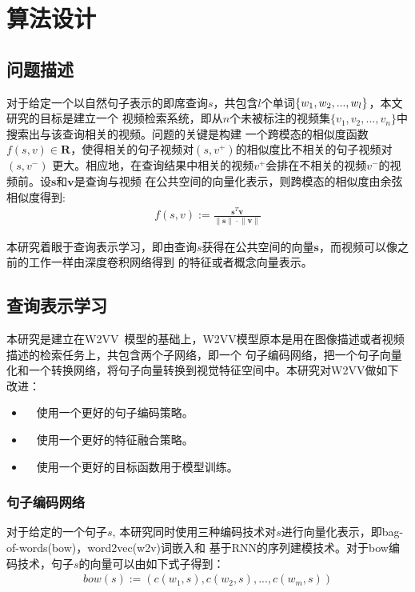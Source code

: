 \chapter{算法设计}

\section{问题描述}
对于给定一个以自然句子表示的即席查询$s$，共包含$l$个单词$\{w_1,w_2,...,\\w_l\}$，本文研究的目标是建立一个
视频检索系统，即从$n$个未被标注的视频集$\{v_1,v_2,...,v_n\}$中搜索出与该查询相关的视频。问题的关键是构建
一个跨模态的相似度函数$f(s,v) \in \mathbf{R}$，使得相关的句子视频对$(s,v^+)$的相似度比不相关的句子视频对$(s,v^-)$
更大。相应地，在查询结果中相关的视频$v^+$会排在不相关的视频$v^-$的视频前。设$\mathbf{s}$和$\mathbf{v}$是查询与视频
在公共空间的向量化表示，则跨模态的相似度由余弦相似度得到:
\begin{equation}
    \label{eq:cosine-sim}
    \begin{aligned}
        f(s,v) := \frac{\mathbf{s}^T\mathbf{v}}{\left\| \mathbf{s} \right\| \cdot \left\| \mathbf{v} \right\|}
    \end{aligned}
\end{equation}

本研究着眼于查询表示学习，即由查询$s$获得在公共空间的向量$\mathbf{s}$，而视频可以像之前的工作一样由深度卷积网络得到
的特征或者概念向量表示。

\section{查询表示学习}
本研究是建立在W2VV~\cite{}模型的基础上，W2VV模型原本是用在图像描述或者视频描述的检索任务上，共包含两个子网络，即一个
句子编码网络，把一个句子向量化和一个转换网络，将句子向量转换到视觉特征空间中。本研究对W2VV做如下改进：
\begin{itemize}
    \item　使用一个更好的句子编码策略。

    \item　使用一个更好的特征融合策略。

    \item　使用一个更好的目标函数用于模型训练。
\end{itemize}

\subsection{句子编码网络}
对于给定的一个句子$s$, 本研究同时使用三种编码技术对$s$进行向量化表示，即bag-of-words(bow)，word2vec(w2v)词嵌入和
基于RNN的序列建模技术。对于bow编码技术，句子$s$的向量可以由如下式子得到：
\begin{equation}
    \label{eq:bow}
    \begin{aligned}
        bow(s) := (c(w_1,s),c(w_2,s),...,c(w_m,s))
    \end{aligned}
\end{equation}

